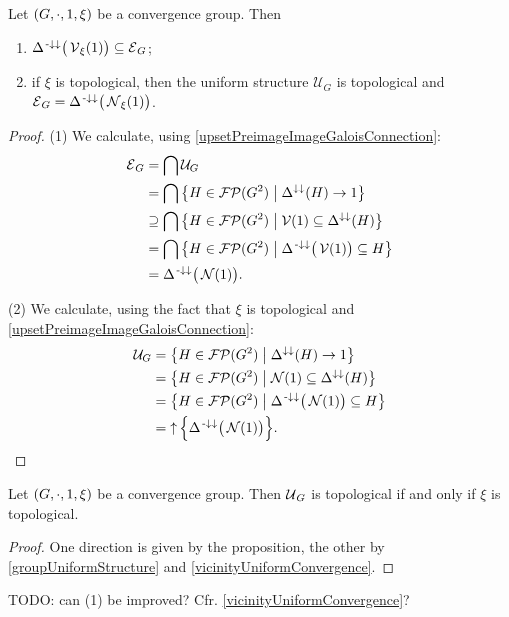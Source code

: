 \begin{proposition} \label{entourageConvergenceGroup}
Let $\sSet{G,\cdot, 1, \xi}$ be a convergence group. Then
\begin{enumerate}
\item $\Delta^{{\text{\hspace{0.15em}-}\downarrow}\downarrow}\big(\operatorname{\mathcal{V}}_\xi(1)\big) \subseteq \operatorname{\mathcal{E}}_{G}$;
\item if $\xi$ is topological, then the uniform structure $\mathcal{U}_G$ is topological and $\operatorname{\mathcal{E}}_{G} = \Delta^{{\text{\hspace{0.15em}-}\downarrow}\downarrow}\big(\operatorname{\mathcal{N}}_\xi(1)\big)$.
\end{enumerate}
\end{proposition}
\begin{proof}
(1) We calculate, using \ref{upsetPreimageImageGaloisConnection}:
\begin{align*}
\entourages_G &= \bigcap \mathcal{U}_G \\
&= \bigcap \setbuilder{H\in \powerfilters(G^2)}{\Delta^{\imf\imf}(H) \to 1} \\
&\supseteq \bigcap \setbuilder{H\in \powerfilters(G^2)}{\vicinities(1) \subseteq \Delta^{\imf\imf}(H)} \\
&= \bigcap \setbuilder{H\in \powerfilters(G^2)}{\Delta^{\preimf\imf}\big(\vicinities(1)\big) \subseteq H} \\
&= \Delta^{\preimf\imf}\big(\neighbourhoods(1)\big).
\end{align*}

(2) We calculate, using the fact that $\xi$ is topological and \ref{upsetPreimageImageGaloisConnection}:
\begin{align*}
\mathcal{U}_G &= \setbuilder{H\in \powerfilters(G^2)}{\Delta^{\imf\imf}(H) \to 1} \\
&= \setbuilder{H\in \powerfilters(G^2)}{\neighbourhoods(1) \subseteq \Delta^{\imf\imf}(H)} \\
&= \setbuilder{H\in \powerfilters(G^2)}{\Delta^{\preimf\imf}\big(\neighbourhoods(1)\big) \subseteq H} \\
&= \upset\Big\{\Delta^{\preimf\imf}\big(\neighbourhoods(1)\big)\Big\}.
\end{align*}
\end{proof}
\begin{corollary} \label{convergenceGroupTopologicalIffUniformlyTopological}
Let $\sSet{G, \cdot, 1, \xi}$ be a convergence group. Then $\operatorname{\mathcal{U}}_G$ is topological \textup{if and only if} $\xi$ is topological.
\end{corollary}
\begin{proof}
One direction is given by the proposition, the other by \ref{groupUniformStructure} and \ref{vicinityUniformConvergence}.
\end{proof}
TODO: can (1) be improved? Cfr. \ref{vicinityUniformConvergence}?

